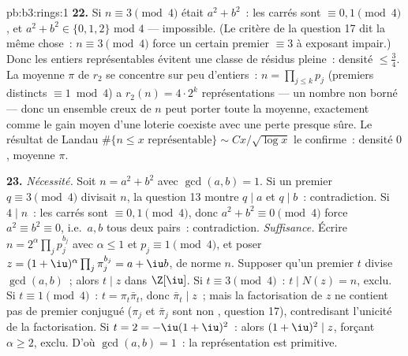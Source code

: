 \begin{solution}{pb:b3:rings:1}
\textbf{22.} Si $n \equiv 3 \pmod4$ était $a^2 + b^2$~: les
carrés sont $\equiv 0, 1 \pmod 4$, et $a^2 + b^2 \in \{0, 1,
2\}$ mod $4$ --- impossible. (Le critère de la question 17 dit
la même chose~: $n \equiv 3 \pmod 4$ force un certain premier
$\equiv 3$ à exposant impair.) Donc les entiers représentables
évitent une classe de résidus pleine~: densité $\leq
\frac34$. La moyenne $\pi$ de $r_2$ se concentre sur peu
d'entiers~: $n = \prod_{j\leq k}p_j$ (premiers distincts $\equiv
1 \bmod 4$) a $r_2(n) = 4\cdot2^k$ représentations --- un nombre
non borné --- donc un ensemble creux de $n$ peut porter toute la
moyenne, exactement comme le gain moyen d'une loterie coexiste
avec une perte presque sûre. Le résultat de Landau
$\#\{n \leq x \text{ représentable}\} \sim Cx/\sqrt{\log x}$
le confirme~: densité $0$, moyenne $\pi$.

\textbf{23.} \emph{Nécessité.} Soit $n = a^2 + b^2$ avec
$\gcd(a, b) = 1$. Si un premier $q \equiv 3 \pmod 4$ divisait
$n$, la question 13 montre $q \mid a$ et $q \mid b$~:
contradiction. Si $4 \mid n$~: les carrés sont $\equiv 0, 1
\pmod 4$, donc $a^2 + b^2 \equiv 0 \pmod 4$ force $a^2 \equiv
b^2 \equiv 0$, i.e.\ $a, b$ tous deux pairs~: contradiction.
\emph{Suffisance.} Écrire $n = 2^{\alpha}\prod_jp_j^{b_j}$ avec
$\alpha \leq 1$ et $p_j \equiv 1 \pmod 4$, et poser $z =
(1+\iu)^{\alpha}\prod_j \pi_j^{b_j} = a + \iu b$, de norme $n$.
Supposer qu'un premier $t$ divise $\gcd(a, b)$~; alors $t \mid z$
dans $\Z[\iu]$. Si $t \equiv 3 \pmod 4$~: $t \mid N(z) = n$,
exclu. Si $t \equiv 1 \pmod 4$~: $t = \pi_t\bar\pi_t$, donc
$\bar\pi_t \mid z$~; mais la factorisation de $z$ ne contient
pas de premier conjugué ($\pi_j$ et $\bar\pi_j$ sont non
, question 17), contredisant l'unicité de la
factorisation. Si $t = 2 = -\iu(1+\iu)^2$~: alors $(1+\iu)^2
\mid z$, forçant $\alpha \geq 2$, exclu. D'où $\gcd(a, b) =
1$~: la représentation est primitive.


\end{solution}
